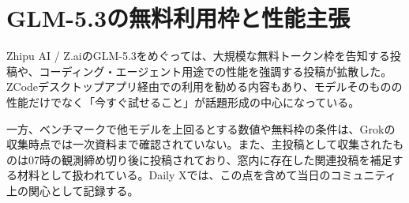 \section{GLM-5.3の無料利用枠と性能主張}

Zhipu AI / Z.aiのGLM-5.3をめぐっては、大規模な無料トークン枠を告知する投稿や、コーディング・エージェント用途での性能を強調する投稿が拡散した。ZCodeデスクトップアプリ経由での利用を勧める内容もあり、モデルそのものの性能だけでなく「今すぐ試せること」が話題形成の中心になっている。

一方、ベンチマークで他モデルを上回るとする数値や無料枠の条件は、Grokの収集時点では一次資料まで確認されていない。また、主投稿として収集されたものは07時の観測締め切り後に投稿されており、窓内に存在した関連投稿を補足する材料として扱われている。Daily Xでは、この点を含めて当日のコミュニティ上の関心として記録する。
